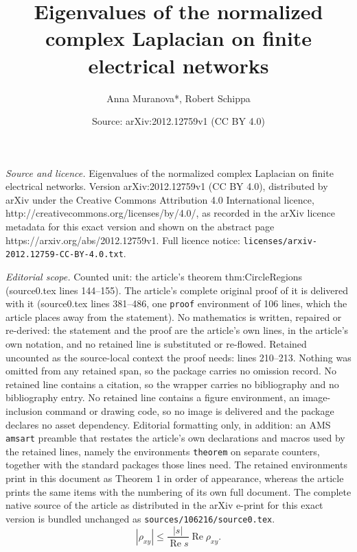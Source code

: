 \documentclass[10pt,a4paper]{amsart}
\title{Eigenvalues of the normalized complex Laplacian on finite electrical networks}
\author{Anna Muranova*, Robert Schippa}
\date{Source: arXiv:2012.12759v1 (CC BY 4.0)}
\renewcommand{\Re}{\operatorname{Re}}%
\begin{document}
\maketitle

\noindent\emph{Source and licence.} Eigenvalues of the normalized complex Laplacian on finite electrical networks. Version arXiv:2012.12759v1 (CC BY 4.0), distributed by arXiv under the Creative Commons Attribution 4.0 International licence, http://creativecommons.org/licenses/by/4.0/, as recorded in the arXiv licence metadata for this exact version and shown on the abstract page https://arxiv.org/abs/2012.12759v1. Full licence notice: \texttt{licenses/arxiv-2012.12759-CC-BY-4.0.txt}.\par\smallskip

\noindent\textit{Editorial scope.} Counted unit: the article's theorem thm:CircleRegions (source0.tex lines 144--155). The article's complete original proof of it is delivered with it (source0.tex lines 381--486, one \texttt{proof} environment of 106 lines, which the article places away from the statement). No mathematics is written, repaired or re-derived: the statement and the proof are the article's own lines, in the article's own notation, and no retained line is substituted or re-flowed.  Retained uncounted as the source-local context the proof needs: lines 210--213.  Nothing was omitted from any retained span, so the package carries no omission record.  No retained line contains a citation, so the wrapper carries no bibliography and no bibliography entry.  No retained line contains a figure environment, an image-inclusion command or drawing code, so no image is delivered and the package declares no asset dependency.  Editorial formatting only, in addition: an AMS \texttt{amsart} preamble that restates the article's own declarations and macros used by the retained lines, namely the environments \texttt{theorem} on separate counters, together with the standard packages those lines need.  The retained environments print in this document as Theorem 1 in order of appearance, whereas the article prints the same items with the numbering of its own full document.  The complete native source of the article as distributed in the arXiv e-print for this exact version is bundled unchanged as \texttt{sources/106216/source0.tex}.
\begin{equation}
\label{eq:EstimateModulusAdmittance}
| \rho_{xy} | \leq \frac{|s|}{\Re s} \Re \rho_{xy}.
\end{equation}
\end{document}
